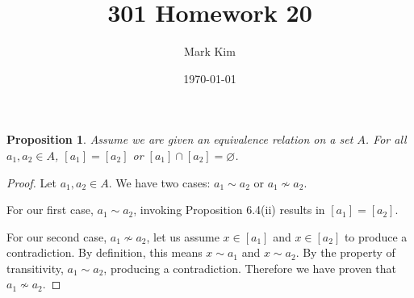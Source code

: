 \documentclass[12pt]{amsart}
\title{301 Homework 20}
\author{Mark Kim}
\date{\today}
\renewcommand{\complement}{^{\mathsf{c}}}
\newtheorem*{proposition}{Proposition}
\begin{document}
\maketitle

\begin{proposition}
Assume we are given an equivalence relation on a set $A$.  For all $a_1,a_2\in A$, $[a_1] = [a_2]$ or $[a_1] \cap [a_2] = \varnothing$.
\end{proposition}

\begin{proof}
Let $a_1,a_2\in A$.  We have two cases: $a_1 \sim a_2$ or $a_1 \not\sim a_2$.

For our first case, $a_1 \sim a_2$, invoking Proposition 6.4(ii) results in $[a_1] = [a_2]$.

For our second case, $a_1 \not\sim a_2$, let us assume $x \in [a_1]$ and $x \in [a_2]$ to produce a contradiction.  By definition, this means $x \sim a_1$ and $x \sim a_2$.  By the property of transitivity, $a_1 \sim a_2$, producing a contradiction.  Therefore we have proven that $a_1 \not\sim a_2$.




\end{proof}
\end{document}
